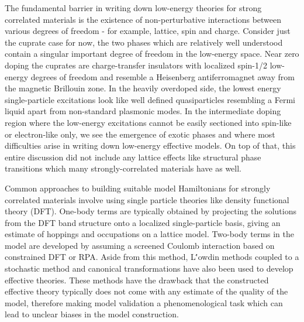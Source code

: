 \documentclass[12pt]{article}
\begin{document}
The fundamental barrier in writing down low-energy theories for strong correlated materials is the existence of non-perturbative interactions between various degrees of freedom - for example, lattice, spin and charge. 
Consider just the cuprate case for now, the two phases which are relatively well understood contain a singular important degree of freedom in the low-energy space. 
Near zero doping the cuprates are charge-transfer insulators with localized spin-1/2 low-energy degrees of freedom and resemble a Heisenberg antiferromagnet away from the magnetic Brillouin zone. 
In the heavily overdoped side, the lowest energy single-particle excitations look like well defined quasiparticles resembling a Fermi liquid apart from non-standard plasmonic modes. 
In the intermediate doping region where the low-energy excitations cannot be easily sectioned into spin-like or electron-like only, we see the emergence of exotic phases and where most difficulties arise in writing down low-energy effective models. 
On top of that, this entire discussion did not include any lattice effects like structural phase transitions which many strongly-correlated materials have as well.

Common approaches to building suitable model Hamiltonians for strongly correlated materials involve using single particle theories like density functional theory (DFT).
One-body terms are typically obtained by projecting the solutions from the DFT band structure onto a localized single-particle basis, giving an estimate of hoppings and occupations on a lattice model.
Two-body terms in the model are developed by assuming a screened Coulomb interaction based on constrained DFT or RPA.
Aside from this method, L\''{o}wdin methods coupled to a stochastic method and canonical transformations have also been used to develop effective theories.
These methods have the drawback that the constructed effective theory typically does not come with any estimate of the quality of the model, therefore making model validation a phenomenological task which can lead to unclear biases in the model construction.
\end{document}
